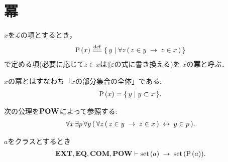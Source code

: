 \section{冪}
	\begin{screen}
		\begin{dfn}[冪]
			$x$を$\mathcal{L}$の項とするとき，
			\begin{align}
				\power{x} \defeq \Set{y}{\forall z\, (\, z \in y \rarrow z \in x\, )}
			\end{align}
			で定める項(必要に応じて$z \in x$は$\lang{\varepsilon}$の式に書き換える)を
			$x$の{\bf 冪}と呼ぶ．
		\end{dfn}
	\end{screen}
	
	$x$の冪とはすなわち「$x$の部分集合の全体」である:
	\begin{align}
		\operatorname*{P}\hspace{0.15em}(x) = \{\, y \mid y \subset x\, \}.
	\end{align}
	
	\begin{screen}
		\begin{axm}[冪の公理]
			次の公理を$\mbox{{\bf POW}}$によって参照する:
			\begin{align}
				\forall x\, \exists p\, \forall y\, 
				(\, \forall z\, (\, z \in y \hspace{0.25em}\rightarrow\hspace{0.25em} z \in x\, ) \hspace{0.25em}\leftrightarrow\hspace{0.25em} y \in p\, ).
			\end{align}
		\end{axm}
	\end{screen}
	
	\begin{screen}
		\begin{thm}[集合の冪は集合]\label{thm:power_of_a_set_is_a_set}
			$a$をクラスとするとき
			\begin{align}
				\mbox{{\bf EXT}},\mbox{{\bf EQ}},\mbox{\bf COM},\mbox{{\bf POW}} \vdash \operatorname*{set}\hspace{0.15em}(a) \hspace{0.25em}\rightarrow\hspace{0.25em} \operatorname*{set}\hspace{0.15em}(\operatorname*{P}\hspace{0.15em}(a)).
			\end{align}
		\end{thm}
	\end{screen}
	
